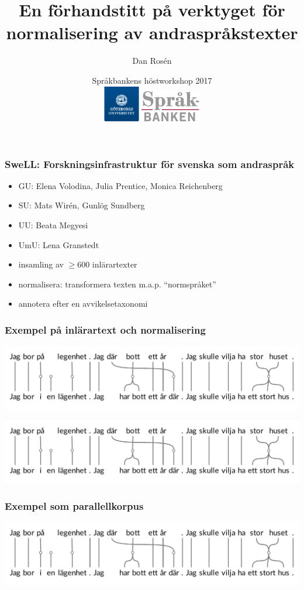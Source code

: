 \documentclass[ignorenonframetext,]{beamer}
\title{\Large
En förhandstitt på verktyget för \\ normalisering av andraspråkstexter
}
\author{\large Dan Rosén \\
}
\date{\large Språkbankens höstworkshop 2017
  \vspace{1cm}
  \\
  \includegraphics[height=1.6cm]{logo_gu.png}
  \hspace{5cm}
  \includegraphics[height=1.4cm]{logo_sb.jpg}
}
\begin{document}
\frame{\titlepage}


\begin{frame}
\frametitle{SweLL:
Forskningsinfrastruktur för svenska som andraspråk}
\begin{itemize}
\item GU: Elena Volodina, Julia Prentice, Monica Reichenberg
\item SU: Mats Wirén, Gunlög Sundberg
\item UU: Beata Megyesi
\item UmU: Lena Granstedt
\vspace{\baselineskip}
\item insamling av $\geq$600 inlärartexter
\item normalisera: transformera texten m.a.p. ``normspråket''
\item annotera efter en avvikelsetaxonomi
\end{itemize}
\end{frame}

\begin{frame}
\frametitle{Exempel på inlärartext och normalisering}
\includegraphics[width=\textwidth, trim={0 3.3cm 0 0}, clip]{ladder_black.pdf}
\pause
\vspace{0.66cm}

\includegraphics[width=\textwidth, trim={0 0 0 3.3cm}, clip]{ladder_black.pdf}
\end{frame}

\begin{frame}
\frametitle{Exempel som parallellkorpus}
\includegraphics[width=\textwidth]{ladder_black.pdf}
\end{frame}
\end{document}
